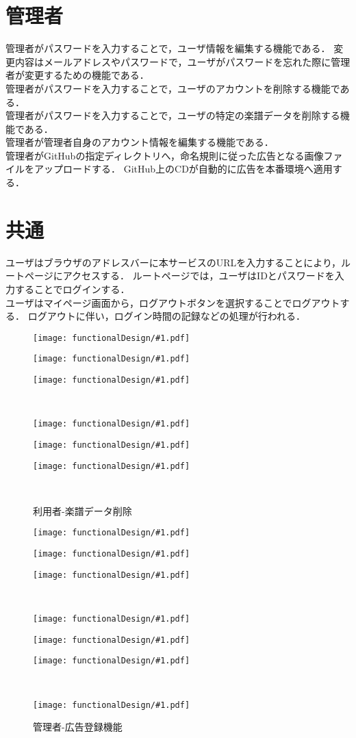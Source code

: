 \section{管理者}
管理者がパスワードを入力することで，ユーザ情報を編集する機能である．
変更内容はメールアドレスやパスワードで，ユーザがパスワードを忘れた際に管理者が変更するための機能である．\\
管理者がパスワードを入力することで，ユーザのアカウントを削除する機能である．\\
管理者がパスワードを入力することで，ユーザの特定の楽譜データを削除する機能である．\\
管理者が管理者自身のアカウント情報を編集する機能である．\\
管理者がGitHubの指定ディレクトリへ，命名規則に従った広告となる画像ファイルをアップロードする．
GitHub上のCDが自動的に広告を本番環境へ適用する．
\section{共通}
ユーザはブラウザのアドレスバーに本サービスのURLを入力することにより，ルートページにアクセスする．
ルートページでは，ユーザはIDとパスワードを入力することでログインする．\\
ユーザはマイページ画面から，ログアウトボタンを選択することでログアウトする．
ログアウトに伴い，ログイン時間の記録などの処理が行われる．
\newcommand{\icd}[2]{\begin{minipage}[b]{.32\textwidth}\centering\texttt{[image: functionalDesign/\#1.pdf]}\caption{#2}\label{#2}\end{minipage}}
\begin{figure}[p]
    \centering
    \icd{211-機能設計-利用者側-ユーザ登録}{利用者-ユーザ登録}
    \icd{212-機能設計-利用者側-ユーザ編集}{利用者-ユーザ編集}
    \icd{213-機能設計-利用者側-ユーザ削除}{利用者-ユーザ削除}\\
    \icd{214-機能設計-利用者側-楽譜データ登録}{利用者-楽譜データ登録}
    \icd{215-機能設計-利用者側-楽譜データ編集}{利用者-楽譜データ編集}
    \icd{216-機能設計-利用者側-楽譜データ削除}{利用者-楽譜データ削除}\\
\end{figure}
\begin{figure}[p]
    \centering
    \icd{221-機能設計-管理者側-ユーザ編集}{管理者-ユーザ編集}
    \icd{222-機能設計-管理者側-ユーザ削除}{管理者-ユーザ削除}
    \icd{223-機能設計-管理者側-楽譜データ削除}{管理者-楽譜データ削除}\\
    \icd{224-機能設計-管理者側-管理者情報編集機能}{管理者-管理者情報編集}
    \icd{217-機能設計-利用者側-ログイン}{共通-ログイン}
    \icd{218-機能設計-利用者側-ログアウト}{共通-ログアウト}\\
    \icd{225-機能設計-管理者側-広告登録機能}{管理者-広告登録機能}
\end{figure}